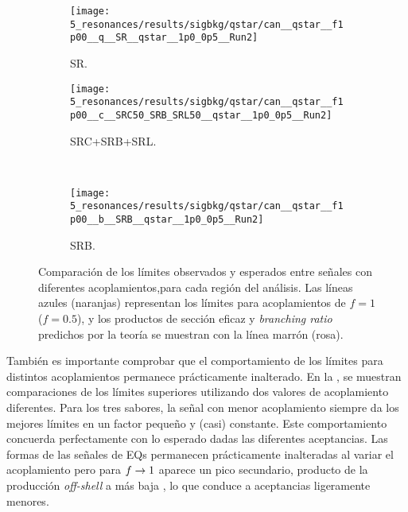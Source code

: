 \begin{figure}[ht!]
    \centering
    \begin{subfigure}[t]{0.49\linewidth}
        \centering
        \texttt{[image: 5\_resonances/results/sigbkg/qstar/can\_\_qstar\_\_f1p00\_\_q\_\_SR\_\_qstar\_\_1p0\_0p5\_\_Run2]}
        \caption{SR.}
        \label{fig:results:results:bkgsig:results:qstar:limits_couplings_comparison:SR}
    \end{subfigure}
    \hfill
    \begin{subfigure}[t]{0.49\linewidth}
        \centering
        \texttt{[image: 5\_resonances/results/sigbkg/qstar/can\_\_qstar\_\_f1p00\_\_c\_\_SRC50\_SRB\_SRL50\_\_qstar\_\_1p0\_0p5\_\_Run2]}
        \caption{SRC+SRB+SRL.}
        \label{fig:results:results:bkgsig:results:qstar:limits_couplings_comparison:SRC}
    \end{subfigure}\\
    \begin{subfigure}[t]{0.49\linewidth}
        \centering
        \texttt{[image: 5\_resonances/results/sigbkg/qstar/can\_\_qstar\_\_f1p00\_\_b\_\_SRB\_\_qstar\_\_1p0\_0p5\_\_Run2]}
        \caption{SRB.}
        \label{fig:results:results:bkgsig:results:qstar:limits_couplings_comparison:SRB}
    \end{subfigure}
    \caption{Comparación de los límites observados y esperados entre señales con diferentes acoplamientos,para cada región del análisis. Las líneas azules (naranjas) representan los límites para acoplamientos de \(f=1\) (\(f=0.5\)), y los productos de sección eficaz y \textit{branching ratio} predichos por la teoría se muestran con la línea marrón (rosa).}
    \label{fig:results:results:bkgsig:results:qstar:limits_couplings_comparison}
\end{figure}

También es importante comprobar que el comportamiento de los límites para distintos acoplamientos permanece prácticamente inalterado. En la \Fig{\ref{fig:results:results:bkgsig:results:qstar:limits_couplings_comparison}}, se muestran comparaciones de los límites superiores utilizando dos valores de acoplamiento diferentes. Para los tres sabores, la señal con menor acoplamiento siempre da los mejores límites en un factor pequeño y (casi) constante. Este comportamiento concuerda perfectamente con lo esperado dadas las diferentes aceptancias. Las formas de las señales de \acp{EQ} permanecen prácticamente inalteradas al variar el acoplamiento pero para \(f\rightarrow 1\) aparece un pico secundario, producto de la producción \textit{off-shell} a más baja \myj, lo que conduce a aceptancias ligeramente menores.



